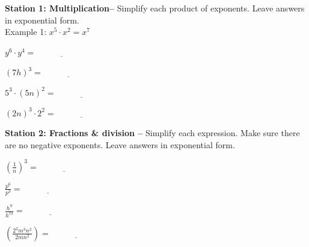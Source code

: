 \documentclass[12pt]{article}
\begin{document}
\textbf{Station 1: Multiplication--} Simplify each product of exponents. Leave answers in exponential form.\\

Example 1: $x^5 \cdot x^2=x^7$\\

\begin{enumerate}
\begin{multicols}{2}

	\item $ y^6 \cdot y^4 =\underline{\hspace{1in}}$\\
	
	\item $(7h)^3=\underline{\hspace{1in}}$\\
	
	\item $ 5^{3} \cdot (5n)^2=\underline{\hspace{1in}}$\\
	
	\item $ (2n)^{3} \cdot 2^2 = \underline{\hspace{1in}}$\\

\end{multicols}
\end{enumerate}


\hrulefill

\textbf{Station 2: Fractions \& division -- } Simplify each expression. Make sure there are no negative exponents. Leave answers in exponential form.\\ 

\begin{enumerate}[resume]
\begin{multicols}{2}

	\item $\left(\frac{1}{n}\right)^{3}=\underline{\hspace{1in}}$\\
	
	\item $\frac{p^6}{p^3}=\underline{\hspace{1in}}$\\
	
	\item $\frac{h^9}{h^{12}}=\underline{\hspace{1in}}$\\
	
	\item $\left(\frac{2^2m^3n^{2}}{2mn^2}\right)=\underline{\hspace{1in}}$\\

\end{multicols}
\end{enumerate}
\end{document}
